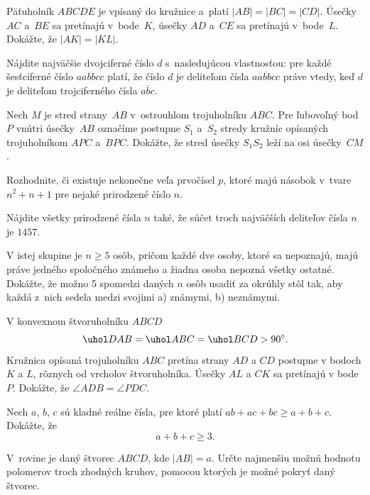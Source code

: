 {%
Päťuholník $ABCDE$ je vpísaný do kružnice a~platí $|AB|=|BC|=|CD|$. Úsečky $AC$ a~$BE$ sa pretínajú v~bode~$K$, úsečky $AD$ a~$CE$ sa pretínajú v~bode~$L$. Dokážte, že $|AK|=|KL|$.}

{%
Nájdite najväčšie dvojciferné číslo $d$ s~nasledujúcou vlastnosťou: pre každé šesťciferné číslo $\overline{aabbcc}$ platí, že číslo $d$ je deliteľom čísla $\overline{aabbcc}$ práve vtedy, keď $d$ je deliteľom trojciferného čísla $\overline{abc}$.}

{%
Nech $M$ je stred strany~$AB$ v~ostrouhlom trojuholníku $ABC$.
Pre ľubovoľný bod~$P$ vnútri úsečky~$AB$ označíme postupne $S_1$ a~$S_2$ stredy kružníc opísaných trojuholníkom $APC$ a~$BPC$. Dokážte,
že stred úsečky $S_1S_2$ leží na osi úsečky~$CM$.}

{%
Rozhodnite, či existuje nekonečne veľa prvočísel $p$, ktoré majú
násobok v~tvare $n^2+n+1$ pre nejaké prirodzené číslo $n$.
}

{%
Nájdite všetky prirodzené čísla $n$ také, že súčet troch najväčších deliteľov čísla $n$ je $1457$.
}

{%
V istej skupine je $n \ge 5$ osôb, pričom každé dve osoby, ktoré sa nepoznajú, majú práve jedného spoločného známeho a žiadna osoba nepozná všetky ostatné. Dokážte, že možno 5 spomedzi daných $n$ osôb usadiť za okrúhly stôl tak, aby každá z~nich sedela medzi svojimi
\ite a) známymi,
\ite b) neznámymi.
}

{%
V konvexnom štvoruholníku $ABCD$
$$
\uhol DAB = \uhol ABC = \uhol BCD > 90^\circ.
$$
Kružnica opísaná trojuholníku $ABC$ pretína strany $AD$ a $CD$ postupne v bodoch $K$ a $L$, rôznych od vrcholov štvor\-u\-hol\-níka. Úsečky $AL$ a $CK$ sa pretínajú v bode $P$. Dokážte, že $\angle ADB = \angle PDC$.
}

{%
Nech $a$, $b$, $c$ sú kladné reálne čísla, pre ktoré platí $ab+ac+bc\ge a+b+c$. Dokážte, že
$$
a+b+c\ge3.
$$}

{%
V~rovine je daný štvorec $ABCD$, kde $|AB|=a$. Určte najmenšiu možnú hodnotu polomerov
troch zhodných kruhov, pomocou ktorých je možné pokryť daný štvorec.}
